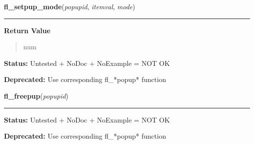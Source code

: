     \label{xformslib:library:fl_setpup_mode}

    \vspace{0.5ex}

\hspace{.8\funcindent}\begin{boxedminipage}{\funcwidth}

    \raggedright \textbf{fl\_setpup\_mode}(\textit{popupid}, \textit{itemval}, \textit{mode})

    \vspace{-1.5ex}

    \rule{\textwidth}{0.5\fboxrule}
\setlength{\parskip}{2ex}
\setlength{\parskip}{1ex}
      \textbf{Return Value}
    \vspace{-1ex}

      \begin{quote}
      num

      \end{quote}

\textbf{Status:} Untested + NoDoc + NoExample = NOT OK



\textbf{Deprecated:} Use corresponding fl\_*popup* function



    \end{boxedminipage}

    \label{xformslib:library:fl_freepup}

    \vspace{0.5ex}

\hspace{.8\funcindent}\begin{boxedminipage}{\funcwidth}

    \raggedright \textbf{fl\_freepup}(\textit{popupid})

    \vspace{-1.5ex}

    \rule{\textwidth}{0.5\fboxrule}
\setlength{\parskip}{2ex}
\setlength{\parskip}{1ex}
\textbf{Status:} Untested + NoDoc + NoExample = NOT OK



\textbf{Deprecated:} Use corresponding fl\_*popup* function



    \end{boxedminipage}

